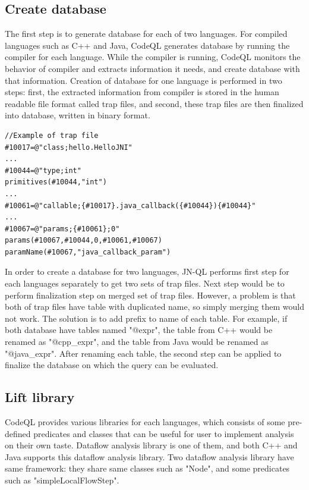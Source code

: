 \subsection{Create database}
The first step is to generate database for each of two languages.  For
compiled languages such as C++ and Java, CodeQL generates database by running
the compiler for each language. While the compiler is running, CodeQL monitors
the behavior of compiler and extracts information it needs, and create database
with that information.  Creation of database for one language is performed in
two steps: first, the extracted information from compiler is stored in the
human readable file format called trap files, and second, these trap files are
then finalized into database, written in binary format.

\begin{lstlisting}[style=java,numbers=none,xleftmargin=2.5em]
//Example of trap file
#10017=@"class;hello.HelloJNI"
...
#10044=@"type;int"
primitives(#10044,"int")
...
#10061=@"callable;{#10017}.java_callback({#10044}){#10044}"
...
#10067=@"params;{#10061};0"
params(#10067,#10044,0,#10061,#10067)
paramName(#10067,"java_callback_param")
\end{lstlisting}

In order to create a database for two languages, JN-QL performs first step for
each languages separately to get two sets of trap files.  Next step would be to
perform finalization step on merged set of trap files. However, a problem is that
both of trap files have table with duplicated name, so simply merging them would not work.
The solution is to add prefix to name of each table. For example, if both
database have tables named "@expr", the table from C++ would be renamed as
"@cpp\_expr", and the table from Java would be renamed as "@java\_expr". After
renaming each table, the second step can be applied to finalize the database on
which the query can be evaluated.

\subsection{Lift library}
CodeQL provides various libraries for each languages, which consists of some
pre-defined predicates and classes that can be useful for user to implement
analysis on their own taste. Dataflow analysis library is one of them, and both
C++ and Java supports this dataflow analysis library. Two dataflow analysis
library have same framework: they share same classes such as "Node", and some
predicates such as "simpleLocalFlowStep".

